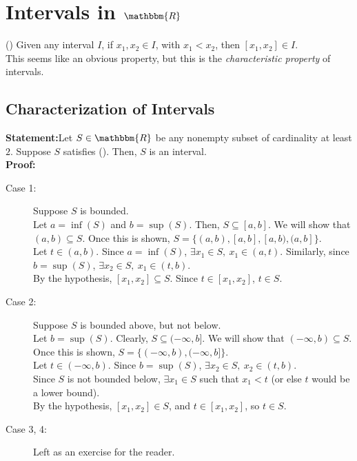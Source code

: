 \documentclass[10pt]{extarticle}
\newcommand{\R}{\mathbbm{R}}
\begin{document}
  \section{Intervals in $\R$}%
    (\textasteriskcentered) Given any interval $I$, if $x_1,x_2\in I$, with $x_1 < x_2$, then $[x_1,x_2]\in I$.\\

    This seems like an obvious property, but this is the \textsl{characteristic property} of intervals.
    \subsection{Characterization of Intervals}%
    \textbf{Statement:}Let $S\in\R$ be any nonempty subset of cardinality at least $2$. Suppose $S$ satisfies (\textasteriskcentered). Then, $S$ is an interval.\\

    \textbf{Proof:}
      \begin{description}
        \item[Case 1:] Suppose $S$ is bounded.\\

          Let $a = \inf(S)$ and $b = \sup(S)$. Then, $S \subseteq [a,b]$. We will show that $(a,b)\subseteq S$. Once this is shown, $S = \{(a,b), [a,b], [a,b), (a,b]\}$.\\

          Let $t\in (a,b)$. Since $a = \inf(S)$, $\exists x_1\in S,~x_1 \in (a,t)$. Similarly, since $b = \sup(S)$, $\exists x_2\in S,~x_1\in (t,b)$.\\

          By the hypothesis, $[x_1,x_2]\subseteq S$. Since $t\in [x_1,x_2]$, $t\in S$.
        \item[Case 2:] Suppose $S$ is bounded above, but not below.\\

          Let $b = \sup(S)$. Clearly, $S \subseteq (-\infty,b]$. We will show that $(-\infty,b)\subseteq S$. Once this is shown, $S = \{(-\infty,b), (-\infty,b]\}$.\\

          Let $t\in (-\infty,b)$. Since $b = \sup(S)$, $\exists x_2\in S,~x_2\in (t,b)$.\\

          Since $S$ is not bounded below, $\exists x_1\in S$ such that $x_1 < t$ (or else $t$ would be a lower bound).\\

          By the hypothesis, $[x_1,x_2]\in S$, and $t\in [x_1,x_2]$, so $t\in S$.
        \item[Case 3, 4:] Left as an exercise for the reader.
      \end{description}
\end{document}
